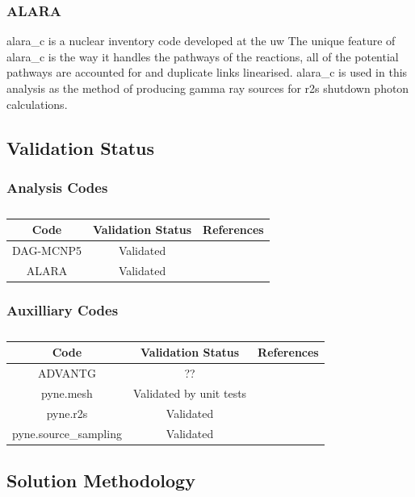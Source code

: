\documentclass[12pt]{article}
\begin{document}
\subsubsection{ALARA}
\gls{alara_c} \cite{alara} is a nuclear inventory code developed at the \gls{uw}
The unique feature of \gls{alara_c} is the way it handles the
pathways of the reactions, all of the potential pathways are accounted for and
duplicate links linearised. \gls{alara_c} is used in this analysis as the method
of producing gamma ray sources for \gls{r2s} shutdown photon calculations.
\subsection{Validation Status}
\subsubsection*{Analysis Codes}
\begin{centering}
 \begin{table}[ht!]
  \begin{tabular}{c | c | c}
  \hline
  Code & Validation Status & References \\
  \hline 
  DAG-MCNP5 & Validated & \\
  ALARA & Validated & \\
  \end{tabular}
 \caption{}
 \label{table:validation}
 \end{table}
\end{centering}
\subsubsection*{Auxilliary Codes}
\begin{centering}
 \begin{table}[ht!]
  \begin{tabular}{c | c | c}
  \hline
  Code & Validation Status & References \\    
  \hline
  ADVANTG & ?? & \\
  pyne.mesh & Validated by unit tests & \\
  pyne.r2s & Validated & \\
  pyne.source\_sampling & Validated & \\
 \end{tabular}
 \caption{}
 \label{table:validation_aux}
 \end{table}
\end{centering}
\newpage
\subsection{Solution Methodology}
\end{document}
